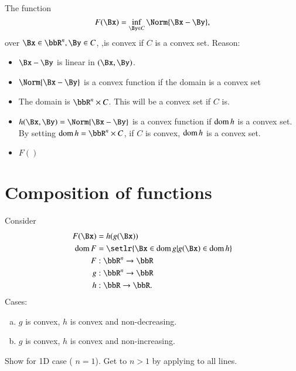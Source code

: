 The function
%
\begin{equation}\label{eqn:convexOptimizationLecture8:140}
F(\Bx) = \inf_{\By \in C} \Norm{ \Bx - \By },
\end{equation}
%
over \( \Bx \in \bbR^n, \By \in C \), ,is convex if \( C \) is a convex set.  Reason:

\begin{itemize}
\item \( \Bx - \By \) is linear in \((\Bx, \By)\).
\item \( \Norm{ \Bx - \By } \) is a convex function if the domain is a convex set
\item The domain is \( \bbR^n \times C \).  This will be a convex set if \( C \) is.
\item \( h(\Bx, \By) = \Norm{\Bx -\By} \) is a convex function if \( \operatorname{dom} h \) is a convex set.  By setting \( \dom h = \bbR^n \times C \), if \( C \) is convex, \( \operatorname{dom} h \) is a convex set.
\item \( F() \)
\end{itemize}

\section{Composition of functions}

Consider
%
\begin{equation}\label{eqn:convexOptimizationLecture8:160}
\begin{aligned}
F(\Bx) &= h(g(\Bx)) \\
\dom F &= \setlr{ \Bx \in \dom g | g(\Bx) \in \dom h } \\
F &: \bbR^n \rightarrow \bbR \\
g &: \bbR^n \rightarrow \bbR \\
h &: \bbR \rightarrow \bbR.
\end{aligned}
\end{equation}
%
Cases:
\begin{enumerate}[(a)]
\item \( g \) is convex, \( h \) is convex and non-decreasing.
\item \( g \) is convex, \( h \) is convex and non-increasing.
\end{enumerate}

Show for 1D case ( \( n = 1 \)).  Get to \( n > 1 \) by applying to all lines.

